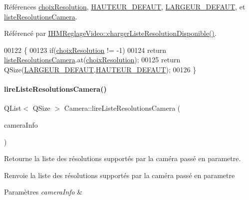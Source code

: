 Références \hyperlink{camera_8h_source_l00072}{choix\+Resolution}, \hyperlink{camera_8h_source_l00041}{H\+A\+U\+T\+E\+U\+R\+\_\+\+D\+E\+F\+A\+UT}, \hyperlink{camera_8h_source_l00035}{L\+A\+R\+G\+E\+U\+R\+\_\+\+D\+E\+F\+A\+UT}, et \hyperlink{camera_8h_source_l00071}{liste\+Resolutions\+Camera}.



Référencé par \hyperlink{ihmreglagevideo_8cpp_source_l00179}{I\+H\+M\+Reglage\+Video\+::charger\+Liste\+Resolution\+Disponible()}.


\begin{DoxyCode}
00122 \{
00123     \textcolor{keywordflow}{if}(\hyperlink{class_camera_a3fdddf6f548f04d7bdc26f32602a03d4}{choixResolution} != -1)
00124         \textcolor{keywordflow}{return} \hyperlink{class_camera_a96af62eaf7828664865b56e7c69e771c}{listeResolutionsCamera}.at(\hyperlink{class_camera_a3fdddf6f548f04d7bdc26f32602a03d4}{choixResolution});
00125     \textcolor{keywordflow}{return} QSize(\hyperlink{camera_8h_afe66edd1ec0aa05058aaa2a069248f65}{LARGEUR\_DEFAUT},\hyperlink{camera_8h_a70cf269dc21e5a921c2927034d6cadd2}{HAUTEUR\_DEFAUT});
00126 \}
\end{DoxyCode}
\mbox{\label{class_camera_ac4756add4cb6bef60e38f3da79c2383f}} 
\paragraph{\texorpdfstring{lire\+Liste\+Resolutions\+Camera()}{lireListeResolutionsCamera()}}
{\footnotesize\ttfamily Q\+List$<$ Q\+Size $>$ Camera\+::lire\+Liste\+Resolutions\+Camera (\begin{DoxyParamCaption}\item[{Q\+Camera\+Info \&}]{camera\+Info }\end{DoxyParamCaption})\hspace{0.3cm}{\ttfamily [static]}}



Retourne la liste des résolutions supportés par la caméra passé en parametre. 

\begin{DoxyReturn}{Renvoie}
la liste des résolutions supportés par la caméra passé en parametre 
\end{DoxyReturn}

\begin{DoxyParams}{Paramètres}
{\em camera\+Info} & \\
\hline
\end{DoxyParams}


